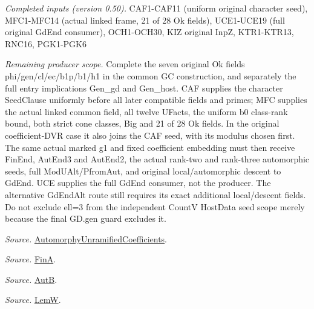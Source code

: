 \documentclass[11pt,a4paper]{article}
\numberwithin{equation}{section}
\theoremstyle{remark}\newtheorem{remark}[theorem]{Remark}
\begin{document}
\emph{Completed inputs (version 0.50).} CAF1-CAF11 (uniform original character seed), MFC1-MFC14 (actual linked frame, 21 of 28 Ok fields), UCE1-UCE19 (full original GdEnd consumer), OCH1-OCH30, KIZ original InpZ, KTR1-KTR13, RNC16, PGK1-PGK6

\emph{Remaining producer scope.} Complete the seven original Ok fields phi/gen/cl/ec/b1p/b1/h1 in the common GC construction, and separately the full entry implications Gen\_\allowbreak gd and Gen\_\allowbreak host. CAF supplies the character SeedClause uniformly before all later compatible fields and primes; MFC supplies the actual linked common field, all twelve UFacts, the uniform b0 class-rank bound, both strict cone classes, Big and 21 of 28 Ok fields. In the original coefficient-DVR case it also joins the CAF seed, with its modulus chosen first. The same actual marked g1 and fixed coefficient embedding must then receive FinEnd, AutEnd3 and AutEnd2, the actual rank-two and rank-three automorphic seeds, full ModUAlt/PfromAut, and original local/automorphic descent to GdEnd. UCE supplies the full GdEnd consumer, not the producer. The alternative GdEndAlt route still requires its exact additional local/descent fields. Do not exclude ell=3 from the independent CountV HostData seed scope merely because the final GD.gen guard excludes it.

\emph{Source.} \href{https://github.com/CocoSgt/riemann-hypothesis-lean/blob/7cbf7a0c32fca1badf05931879a37c3f8a2b03b4/src/Development/AutomorphicArithmetic/AutomorphicVarieties/AutomorphicCases/AutomorphyUnramifiedCoefficients.lean#L24-L27}{AutomorphyUnramifiedCoefficients}.

\emph{Source.} \href{https://github.com/CocoSgt/riemann-hypothesis-lean/blob/7cbf7a0c32fca1badf05931879a37c3f8a2b03b4/src/Development/AutomorphicArithmetic/AutomorphicVarieties/AutomorphicCases/AutomorphyUnramifiedCoefficients.lean#L12-L13}{FinA}.

\emph{Source.} \href{https://github.com/CocoSgt/riemann-hypothesis-lean/blob/7cbf7a0c32fca1badf05931879a37c3f8a2b03b4/src/Development/AutomorphicArithmetic/AutomorphicVarieties/AutomorphicCases/AutomorphyUnramifiedCoefficients.lean#L15-L17}{AutB}.

\emph{Source.} \href{https://github.com/CocoSgt/riemann-hypothesis-lean/blob/7cbf7a0c32fca1badf05931879a37c3f8a2b03b4/src/Development/AutomorphicArithmetic/AutomorphicVarieties/AutomorphicCases/AutomorphyUnramifiedCoefficients.lean#L19-L22}{LemW}.
\end{document}

